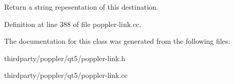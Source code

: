 Return a string repesentation of this destination. 

Definition at line 388 of file poppler-\/link.\+cc.



The documentation for this class was generated from the following files\+:\begin{DoxyCompactItemize}
\item 
thirdparty/poppler/qt5/poppler-\/link.\+h\item 
thirdparty/poppler/qt5/poppler-\/link.\+cc\end{DoxyCompactItemize}
